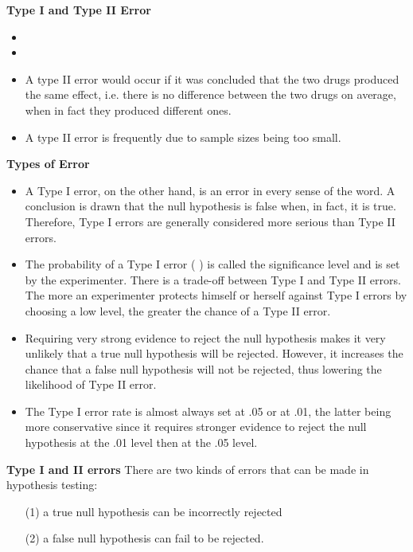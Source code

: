




\noindent \textbf{Type I and Type II Error}
\begin{itemize}
\item
\item
\item A type II error would occur if it was concluded that the two drugs produced the same effect, i.e. there is no difference between the two drugs on average, when in fact they produced different ones.
\item A type II error is frequently due to sample sizes being too small.
\end{itemize}


\noindent \textbf{Types of Error}
\begin{itemize}
\item
A Type I error, on the other hand, is an error in every sense of the word. A conclusion is drawn that the null hypothesis is false when, in fact, it is true. Therefore, Type I errors are generally considered more serious than Type II errors.
 \item
The probability of a Type I error ( ) is called the significance level and is set by the experimenter. There is a trade-off between Type I and Type II errors. The more an experimenter protects himself or herself against Type I errors by choosing a low level, the greater the chance of a Type II error.
\item
Requiring very strong evidence to reject the null hypothesis makes it very unlikely that a true null hypothesis will be rejected. However, it increases the chance that a false null hypothesis will not be rejected, thus lowering the likelihood of Type II error.
\item
The Type I error rate is almost always set at .05 or at .01, the latter being more conservative since it requires stronger evidence to reject the null hypothesis at the .01 level then at the .05 level.
\end{itemize}



\noindent \textbf{Type I and II errors}
There are two kinds of errors that can be made in hypothesis testing:
\begin{itemize}
\item[(1)] a true null hypothesis can be incorrectly rejected
\item[(2)] a false null hypothesis can fail to be rejected.
\end{itemize}

